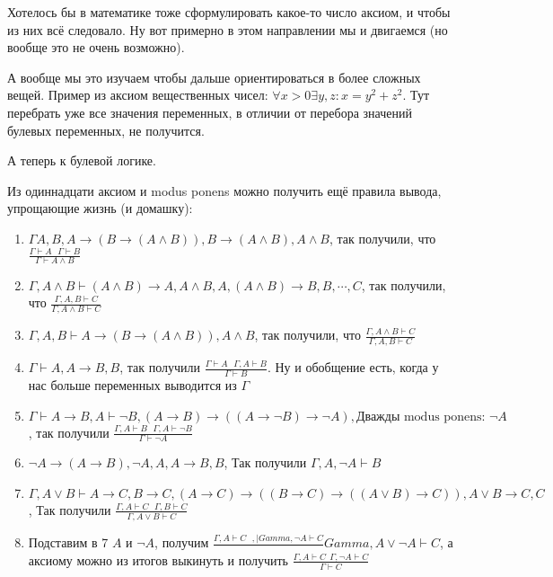 Хотелось бы в математике тоже сформулировать какое-то число аксиом, и чтобы из них всё следовало. Ну вот примерно в этом направлении мы и двигаемся (но вообще это не очень возможно). 

А вообще мы это изучаем чтобы дальше ориентироваться в более сложных вещей. Пример из аксиом вещественных чисел: $\forall x > 0 \exists y, z : x = y^2 + z^2$. Тут перебрать уже все значения переменных, в отличии от перебора значений булевых переменных, не получится. 

А теперь к булевой логике.


Из одиннадцати аксиом и modus ponens можно получить ещё правила вывода, упрощающие жизнь (и домашку):

\begin{enumerate}
	\item{$\Gamma A, B, A \to (B \to (A \land B)), B \to (A \land B), A \land B$, так получили, что $\frac{\Gamma \vdash A\ \ \ \Gamma \vdash B}{\Gamma \vdash A \land B}$}
	\item{$ \Gamma, A \land B \vdash (A \land B) \to A, A \land B, A, (A \land B) \to B, B, \cdots, C$, так получили, что $\frac{\Gamma, A, B \vdash C}{\Gamma, A \land B \vdash C}$}
	\item{$\Gamma, A, B \vdash A \to (B \to (A \land B)), A \land B $, так получили, что $\frac{\Gamma, A \land B \vdash C}{\Gamma, A, B \vdash C}$}
	\item{$\Gamma \vdash A, A \to B, B$, так получили $\frac{\Gamma \vdash A\ \ \ \Gamma, A \vdash B}{\Gamma \vdash B}$. Ну и обобщение есть, когда у нас больше переменных выводится из $\Gamma$}
	\item{$\Gamma \vdash A \to B, A \vdash \lnot B, (A \to B) \to ((A \to \lnot B) \to \lnot A ), \text{Дважды modus ponens: } \lnot A$, так получили $\frac{\Gamma, A \vdash B\ \ \ \Gamma, A \vdash \lnot B}{\Gamma \vdash \lnot A} $}
	\item{$\lnot A \to (A \to B), \lnot A, A, A \to B, B$, Так получили $\Gamma, A, \lnot A \vdash B$}
	\item{$\Gamma, A \lor B \vdash A \to C, B \to C, (A \to C) \to ((B \to C) \to ((A \lor B) \to C)), A \lor B \to C, C$, Так получили $\frac{\Gamma, A \vdash C\ \ \ \Gamma, B \vdash C}{\Gamma, A \lor B \vdash C}$}
	\item{Подставим в 7 $A$ и $\lnot A$, получим $\frac{\Gamma, A \vdash C\ \ \ , |Gamma, \lnot A \vdash C}{}Gamma, A \lor \lnot A \vdash C$, а аксиому можно из итогов выкинуть и получить $\frac{\Gamma, A \vdash C\ \ \Gamma, \lnot A \vdash C}{\Gamma \vdash C}$}
\end{enumerate}

